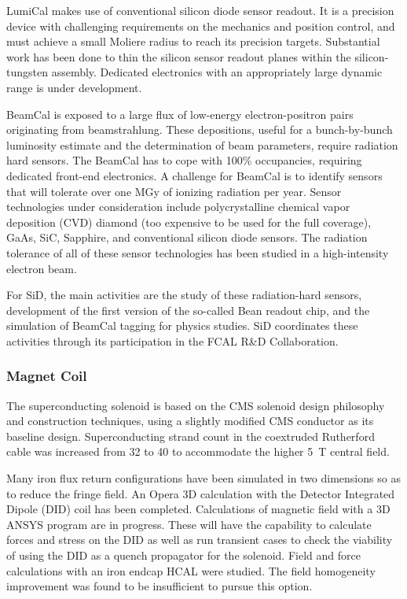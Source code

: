 LumiCal makes use of conventional silicon diode sensor readout. It is a precision device with challenging requirements on the mechanics and position control, and must achieve a small Moliere radius to reach its precision targets. Substantial work has been done to thin the silicon sensor readout planes within the silicon-tungsten assembly. Dedicated electronics with an appropriately large dynamic range is under development.

BeamCal is exposed to a large flux of low-energy electron-positron pairs originating from beamstrahlung. These depositions, useful for a bunch-by-bunch luminosity estimate and the determination of beam parameters, require radiation hard sensors. The BeamCal has to cope with 100\% occupancies, requiring dedicated front-end electronics. A challenge for BeamCal is to identify sensors that will tolerate over one MGy of ionizing radiation per year. Sensor technologies under consideration include polycrystalline chemical vapor deposition (CVD) diamond (too expensive to be used for the full coverage), GaAs, SiC, Sapphire, and conventional silicon diode sensors. The radiation tolerance of all of these sensor technologies has been studied in a high-intensity electron beam. 

For SiD, the main activities are the study of these radiation-hard sensors, development of the first version of the so-called Bean readout chip, and the simulation of BeamCal tagging for physics studies. SiD coordinates these activities through its participation in the FCAL R\&D Collaboration.

\subsubsection{Magnet Coil}

The \sid superconducting solenoid is based on the CMS solenoid
design philosophy and construction techniques, using a slightly modified CMS
conductor as its baseline design. Superconducting strand count in the coextruded
Rutherford cable was increased from 32 to 40 to accommodate the higher 5~T
central field. 

Many iron flux return configurations have been simulated in two
dimensions so as to reduce the fringe field. An Opera 3D calculation with the Detector
Integrated Dipole (DID) coil has been completed.
Calculations of magnetic field with a 3D ANSYS program
are in progress. These will have the capability to calculate forces and stress
on the DID as well as run transient cases to check the viability of using the
DID as a quench propagator for the solenoid. Field and force calculations with
an iron endcap HCAL were studied. The field homogeneity improvement was found
to be insufficient to pursue this option. 

